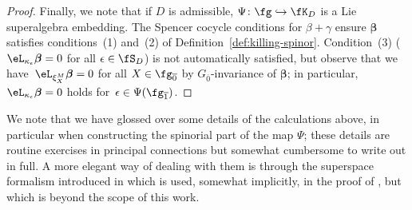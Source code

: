 \begin{proof}
	Finally, we note that if $D$ is admissible, $\Psi\colon\fg\hookrightarrow\fK_D$ is a Lie superalgebra embedding. The Spencer cocycle conditions for $\beta+\gamma$ ensure $\boldsymbol{\beta}$ satisfies conditions~(1) and~(2) of Definition~\ref{def:killing-spinor}. Condition~(3) ($\eL_{\kappa_\epsilon}\boldsymbol{\beta}=0$ for all $\epsilon\in\fS_D$) is not automatically satisfied, but observe that we have~$\eL_{\xi^M_X}\boldsymbol{\beta}=0$ for all $X\in\fg_{\overline 0}$ by $G_{\overline 0}$-invariance of $\boldsymbol{\beta}$; in particular, $\eL_{\kappa_\epsilon}\boldsymbol{\beta}=0$ holds for~${\epsilon\in\Psi(\fg_{\overline 1})}$.
\end{proof}

We note that we have glossed over some details of the calculations above, in particular when constructing the spinorial part of the map $\Psi$; these details are routine exercises in principal connections but somewhat cumbersome to write out in full. A more elegant way of dealing with them is through the superspace formalism introduced in \cite{Santi2010} which is used, somewhat implicitly, in the proof of \cite[Theorem~13]{Figueroa-OFarrill2017_1}, but which is beyond the scope of this work.
